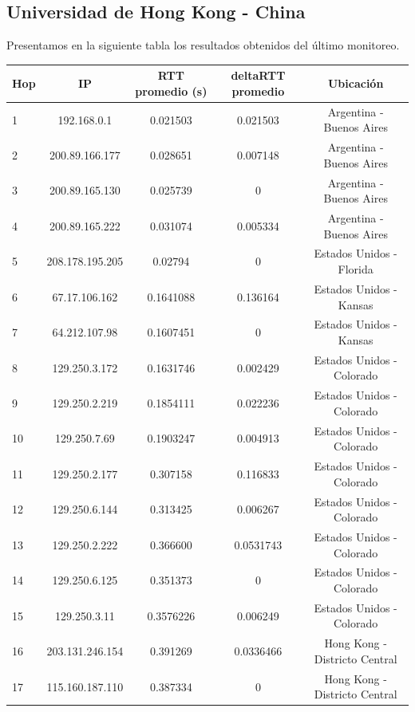 \subsection{Universidad de Hong Kong - China}
Presentamos en la siguiente tabla los resultados obtenidos del último monitoreo.

\bigskip

\begin{tabular}{ | l | c | c | c | c |}
	\hline
		Hop & IP &  RTT promedio (s)  & deltaRTT promedio & Ubicación\\
 	\hline
		1  &  192.168.0.1  &  0.021503 &  0.021503 & Argentina - Buenos Aires \\
	\hline
		2  &  200.89.166.177  &  0.028651 &  0.007148 & Argentina - Buenos Aires\\
	\hline
		3  &  200.89.165.130  &  0.025739 &  0 & Argentina - Buenos Aires\\
	\hline
		4  &  200.89.165.222  &  0.031074 &  0.005334 & Argentina - Buenos Aires\\
	\hline
		5  &  208.178.195.205  &  0.02794 &  0 & Estados Unidos - Florida \\
	\hline
		6  &  67.17.106.162  &  0.1641088 &  0.136164 & Estados Unidos - Kansas \\
	\hline
		7  &  64.212.107.98  &  0.1607451 &  0 & Estados Unidos - Kansas \\
	\hline
		8  &  129.250.3.172  &  0.1631746 &  0.002429 & Estados Unidos - Colorado \\
	\hline
		9  &  129.250.2.219  &  0.1854111 &  0.022236 & Estados Unidos - Colorado\\
	\hline
		10  &  129.250.7.69  &  0.1903247 &  0.004913 & Estados Unidos - Colorado \\
	\hline
		11  &  129.250.2.177  &  0.307158 &  0.116833 & Estados Unidos - Colorado \\
	\hline
		12  &  129.250.6.144  &  0.313425 &  0.006267 & Estados Unidos - Colorado\\
	\hline
		13  &  129.250.2.222  &  0.366600 &  0.0531743 & Estados Unidos - Colorado\\
	\hline
		14  &  129.250.6.125  &  0.351373 &  0 & Estados Unidos - Colorado \\
	\hline
		15  &  129.250.3.11  &  0.3576226 &  0.006249 & Estados Unidos - Colorado\\
	\hline
		16  &  203.131.246.154 &  0.391269 &  0.0336466 & Hong Kong - Districto Central \\
	\hline
		17  &  115.160.187.110 &  0.387334 &  0 & Hong Kong - Districto Central\\

\end{tabular}
